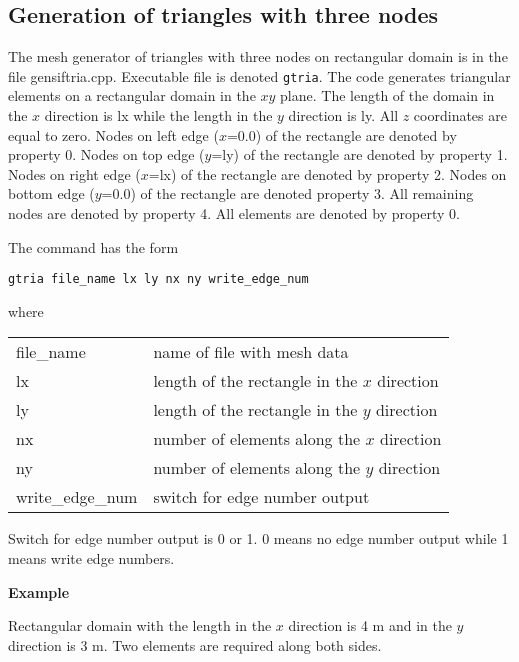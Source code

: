 \documentclass[12pt]{book}
\begin{document}
\subsection{Generation of triangles with three nodes}

The mesh generator of triangles with three nodes on rectangular domain is in the file gensiftria.cpp.
Executable file is denoted {\tt gtria}. The code generates triangular elements on a rectangular domain
in the $xy$ plane. The length of the domain in the $x$ direction is lx while the length in the $y$ direction
is ly. All $z$ coordinates are equal to zero. Nodes on left edge ($x$=0.0) of the rectangle
are denoted by property 0. Nodes on top edge ($y$=ly) of the rectangle are denoted by property 1.
Nodes on right edge ($x$=lx) of the rectangle are denoted by property 2. Nodes on bottom edge ($y$=0.0)
of the rectangle are denoted property 3. All remaining nodes are denoted by property 4.
All elements are denoted by property 0.

\vspace{2mm}
\noindent
The command has the form

{\tt gtria file\_name lx ly nx ny write\_edge\_num}

\vspace{2mm}
\noindent
where

\vspace{2mm}
\noindent
\begin{center}
\begin{tabular}{ll}
file\_name & name of file with mesh data
\\
lx & length of the rectangle in the $x$ direction
\\
ly & length of the rectangle in the $y$ direction
\\
nx & number of elements along the $x$ direction
\\
ny & number of elements along the $y$ direction
\\
write\_edge\_num & switch for edge number output
\\
\end{tabular}
\end{center}

\noindent
Switch for edge number output is 0 or 1. 0 means no edge number output
while 1 means write edge numbers.

\vspace{3mm}
\noindent
{\bf Example}

\noindent
Rectangular domain with the length in the $x$ direction is 4 m and in the
$y$ direction is 3 m. Two elements are required along both sides.
\end{document}
